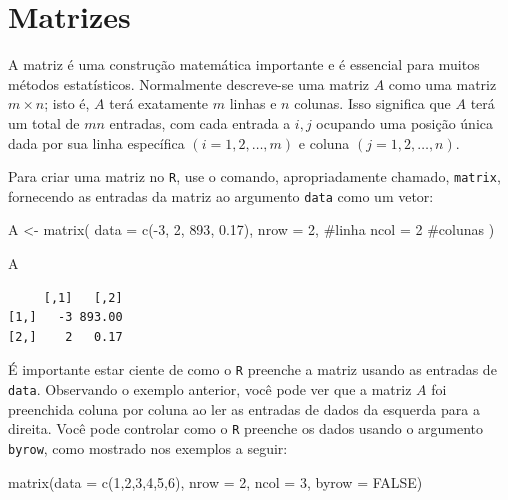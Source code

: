 \documentclass[
  letterpaper,
  DIV=11,
  numbers=noendperiod]{scrreprt}
\newenvironment{Shaded}{\begin{snugshade}}{\end{snugshade}}
\newcommand{\AttributeTok}[1]{\textcolor[rgb]{0.40,0.45,0.13}{#1}}
\newcommand{\CommentTok}[1]{\textcolor[rgb]{0.37,0.37,0.37}{#1}}
\newcommand{\ConstantTok}[1]{\textcolor[rgb]{0.56,0.35,0.01}{#1}}
\newcommand{\DecValTok}[1]{\textcolor[rgb]{0.68,0.00,0.00}{#1}}
\newcommand{\FloatTok}[1]{\textcolor[rgb]{0.68,0.00,0.00}{#1}}
\newcommand{\FunctionTok}[1]{\textcolor[rgb]{0.28,0.35,0.67}{#1}}
\newcommand{\NormalTok}[1]{\textcolor[rgb]{0.00,0.23,0.31}{#1}}
\newcommand{\OtherTok}[1]{\textcolor[rgb]{0.00,0.23,0.31}{#1}}
\newcommand{\SpecialCharTok}[1]{\textcolor[rgb]{0.37,0.37,0.37}{#1}}
\begin{document}
\section{Matrizes}\label{matrizes}

A matriz é uma construção matemática importante e é essencial para
muitos métodos estatísticos. Normalmente descreve-se uma matriz \(A\)
como uma matriz \(m \times n\); isto é, \(A\) terá exatamente \(m\)
linhas e \(n\) colunas. Isso significa que \(A\) terá um total de \(mn\)
entradas, com cada entrada a \(i, j\) ocupando uma posição única dada
por sua linha específica \((i = 1, 2,\dots, m)\) e coluna
\((j = 1, 2,\dots, n)\).

Para criar uma matriz no \texttt{R}, use o comando, apropriadamente
chamado, \texttt{matrix}, fornecendo as entradas da matriz ao argumento
\texttt{data} como um vetor:

\begin{Shaded}
\begin{Highlighting}[]
\NormalTok{A }\OtherTok{\textless{}{-}} \FunctionTok{matrix}\NormalTok{(}
     \AttributeTok{data =} \FunctionTok{c}\NormalTok{(}\SpecialCharTok{{-}}\DecValTok{3}\NormalTok{, }\DecValTok{2}\NormalTok{, }\DecValTok{893}\NormalTok{, }\FloatTok{0.17}\NormalTok{),}
     \AttributeTok{nrow =} \DecValTok{2}\NormalTok{, }\CommentTok{\#linha}
     \AttributeTok{ncol =} \DecValTok{2}  \CommentTok{\#colunas}
\NormalTok{     )}


\NormalTok{A}
\end{Highlighting}
\end{Shaded}

\begin{verbatim}
     [,1]   [,2]
[1,]   -3 893.00
[2,]    2   0.17
\end{verbatim}

É importante estar ciente de como o \texttt{R} preenche a matriz usando
as entradas de \texttt{data}. Observando o exemplo anterior, você pode
ver que a matriz \(A\) foi preenchida coluna por coluna ao ler as
entradas de dados da esquerda para a direita. Você pode controlar como o
\texttt{R} preenche os dados usando o argumento \texttt{byrow}, como
mostrado nos exemplos a seguir:

\begin{Shaded}
\begin{Highlighting}[]
\FunctionTok{matrix}\NormalTok{(}\AttributeTok{data =} \FunctionTok{c}\NormalTok{(}\DecValTok{1}\NormalTok{,}\DecValTok{2}\NormalTok{,}\DecValTok{3}\NormalTok{,}\DecValTok{4}\NormalTok{,}\DecValTok{5}\NormalTok{,}\DecValTok{6}\NormalTok{), }\AttributeTok{nrow =} \DecValTok{2}\NormalTok{, }\AttributeTok{ncol =} \DecValTok{3}\NormalTok{, }\AttributeTok{byrow =} \ConstantTok{FALSE}\NormalTok{)}
\end{Highlighting}
\end{Shaded}
\end{document}
